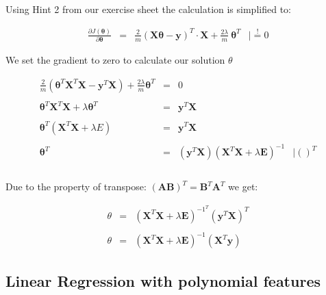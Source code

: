 \documentclass{article}
\begin{document}
\begin{itemize}
    Using Hint 2 from our exercise sheet the calculation is simplified to:
    
    $$\begin{array}{rclr}
        \frac{\partial J(\boldsymbol{\theta})}{\partial \boldsymbol{\theta}} & = & \frac{2}{m}(\boldsymbol{X\theta - y})^T \cdot \boldsymbol{X} + \frac{2\lambda}{m}\ \boldsymbol{\theta}^T & \mid \overset{!}{=} 0
    \end{array}$$

    We set the gradient to zero to calculate our solution $\theta$
    
    $$\begin{array}{rclr}    
    \frac{2}{m}(\boldsymbol{\theta}^T \boldsymbol{X}^T \boldsymbol{X} - \boldsymbol{y}^T \boldsymbol{X}) + \frac{2\lambda}{m}\boldsymbol{\theta}^T & = & 0 \\\\
    \boldsymbol{\theta}^T \boldsymbol{X}^T \boldsymbol{X} + \lambda \boldsymbol{\theta}^T & = & \boldsymbol{y}^T \boldsymbol{X} & \\\\
    \boldsymbol{\theta}^T (\boldsymbol{X}^T \boldsymbol{X} + \lambda E) & = & \boldsymbol{y}^T\boldsymbol{X} & \\\\
    \boldsymbol{\theta}^T & = & (\boldsymbol{y}^T \boldsymbol{X})(\boldsymbol{X}^T \boldsymbol{X} + \lambda \boldsymbol{E})^{-1} & \mid ()^T \\\\
    \end{array}$$
	
	Due to the property of transpose: $ (\boldsymbol{A}\boldsymbol{B})^T = \boldsymbol{B}^T\boldsymbol{A}^T $ we get:
	
	$$\begin{array}{rcl}
	
    \theta & = & (\boldsymbol{X}^T\boldsymbol{X} + \lambda\boldsymbol{E})^{-1^T} (\boldsymbol{y}^T\boldsymbol{X})^T \\\\
    \theta & = & (\boldsymbol{X}^T\boldsymbol{X} + \lambda\boldsymbol{E})^{-1} (\boldsymbol{X}^T\boldsymbol{y})
	\end{array}$$

    
    
    
 
    
\end{itemize}

\subsection{Linear Regression with polynomial features}
\end{document}

